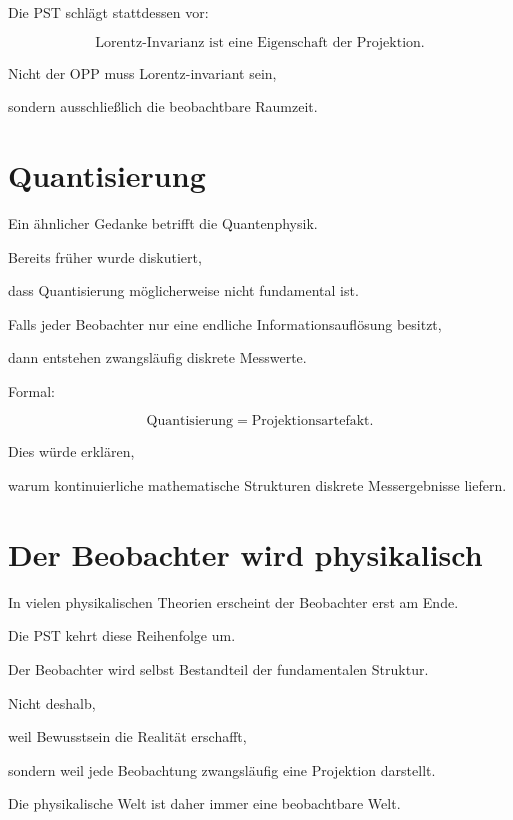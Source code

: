 Die PST schlägt stattdessen vor:

\[
\boxed{
\text{Lorentz-Invarianz ist eine Eigenschaft der Projektion.}
}
\]

Nicht der OPP muss Lorentz-invariant sein,

sondern ausschließlich die beobachtbare Raumzeit.


\section*{Quantisierung}

Ein ähnlicher Gedanke betrifft die Quantenphysik.

Bereits früher wurde diskutiert,

dass Quantisierung möglicherweise nicht fundamental ist.

Falls jeder Beobachter nur eine endliche Informationsauflösung besitzt,

dann entstehen zwangsläufig diskrete Messwerte.

Formal:

\[
\boxed{
\text{Quantisierung}
=
\text{Projektionsartefakt}.
}
\]

Dies würde erklären,

warum kontinuierliche mathematische Strukturen diskrete Messergebnisse liefern.


\section*{Der Beobachter wird physikalisch}

In vielen physikalischen Theorien erscheint der Beobachter erst am Ende.

Die PST kehrt diese Reihenfolge um.

Der Beobachter wird selbst Bestandteil der fundamentalen Struktur.

Nicht deshalb,

weil Bewusstsein die Realität erschafft,

sondern weil jede Beobachtung zwangsläufig eine Projektion darstellt.

Die physikalische Welt ist daher immer eine beobachtbare Welt.


